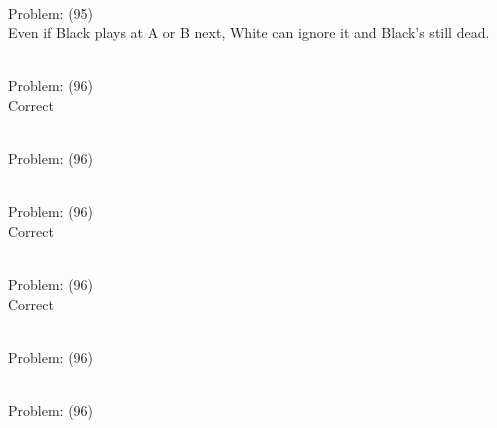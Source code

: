 \documentclass[11pt]{article}
\begin{document}
\begin{minipage}[t]{0.5\textwidth}
  {\centering
  
\\
Problem: (95)\\
Even if Black plays at A or B next, White can ignore it and Black's still dead.\\
  }
\end{minipage}
\begin{minipage}[t]{0.5\textwidth}
  {\centering
  
\\
Problem: (96)\\
Correct\\
  }
\end{minipage}
\begin{minipage}[t]{0.5\textwidth}
  {\centering
  
\\
Problem: (96)\\
  }
\end{minipage}
\begin{minipage}[t]{0.5\textwidth}
  {\centering
  
\\
Problem: (96)\\
Correct\\
  }
\end{minipage}
\begin{minipage}[t]{0.5\textwidth}
  {\centering
  
\\
Problem: (96)\\
Correct\\
  }
\end{minipage}
\begin{minipage}[t]{0.5\textwidth}
  {\centering
  
\\
Problem: (96)\\
  }
\end{minipage}
\begin{minipage}[t]{0.5\textwidth}
  {\centering
  
\\
Problem: (96)\\
  }
\end{minipage}
\end{document}
